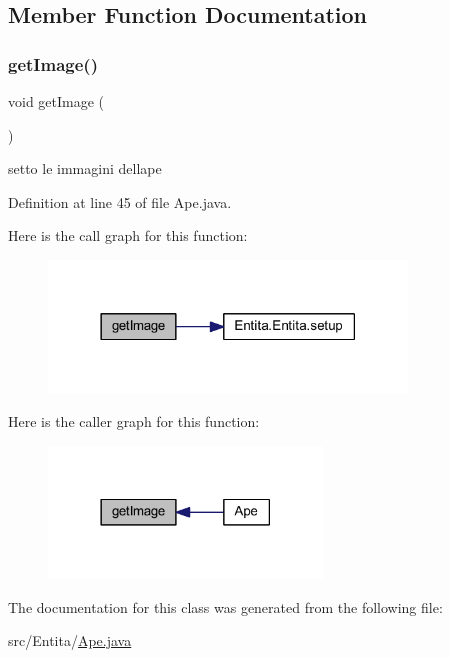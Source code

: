 \subsection{Member Function Documentation}
\mbox{\label{class_entita_1_1_ape_acd4bd75c24769238f365de299bde96ac}} 
\subsubsection{\texorpdfstring{get\+Image()}{getImage()}}
{\footnotesize\ttfamily void get\+Image (\begin{DoxyParamCaption}{ }\end{DoxyParamCaption})}



setto le immagini dell\textquotesingle{}ape 



Definition at line 45 of file Ape.\+java.

Here is the call graph for this function\+:
\nopagebreak
\begin{figure}[H]
\begin{center}
\leavevmode
\includegraphics[width=270pt]{class_entita_1_1_ape_acd4bd75c24769238f365de299bde96ac_cgraph}
\end{center}
\end{figure}
Here is the caller graph for this function\+:
\nopagebreak
\begin{figure}[H]
\begin{center}
\leavevmode
\includegraphics[width=206pt]{class_entita_1_1_ape_acd4bd75c24769238f365de299bde96ac_icgraph}
\end{center}
\end{figure}


The documentation for this class was generated from the following file\+:\begin{DoxyCompactItemize}
\item 
src/\+Entita/\hyperlink{_ape_8java}{Ape.\+java}\end{DoxyCompactItemize}
